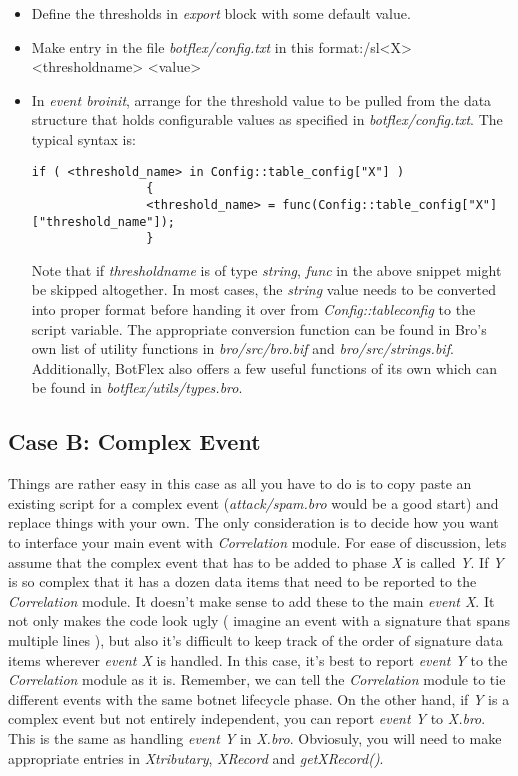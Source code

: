 \documentclass[acmtocl]{acmtrans2m}
\begin{document}
\begin{itemize}
\item Define the thresholds in \textit{export} block with some
default value.
\item Make entry in the file \textit{botflex/config.txt}
in this format:/sl{<X> <threshold\textunderscore name> <value>}
\item In \textit{event bro\textunderscore init}, arrange for the threshold value
to be pulled from the data structure that holds configurable
values as specified in \textit{botflex/config.txt}.
The typical syntax is:
\begin{verbatim}
if ( <threshold_name> in Config::table_config["X"] )
				{
				<threshold_name> = func(Config::table_config["X"]["threshold_name"]);
				}
\end{verbatim}

Note that if \textit{threshold\textunderscore name} is of type \textit{string}, 
\textit{func} in the above snippet might be skipped altogether. 
In most cases, the \textit{string} value needs to be converted into
proper format before handing it over from \textit{Config::table\textunderscore config}
to the script variable. The appropriate conversion function can be 
found in Bro's own list of utility functions in \textit{bro/src/bro.bif}
and \textit{bro/src/strings.bif}. Additionally, BotFlex also offers a few
useful functions of its own which can be found in 
\textit{botflex/utils/types.bro}.  				
\end{itemize}

\subsection{Case B: Complex Event}
Things are rather easy in this case as all you have to do
is to copy paste an existing script for a complex event
(\textit{attack/spam.bro} would be a good start)
and replace things with your own. The only consideration is
to decide how you want to interface your main event with
\textit{Correlation} module. For ease of discussion, lets assume 
that the complex event that has to be added to phase \textit{X} is called 
\textit{Y}. If \textit{Y} is so complex that it has a dozen data items 
that need to be reported to the \textit{Correlation} module.
It doesn't make sense to add these to the main \textit{event X}.
It not only makes the code look ugly ( imagine an event with a
signature that spans multiple lines ), but also it's difficult
to keep track of the order of signature data items wherever
\textit{event X} is handled. In this case, it's best to report 
\textit{event Y} to the \textit{Correlation} module as it is. 
Remember, we can tell the \textit{Correlation} module to tie different
events with the same botnet lifecycle phase. On the other hand,
if \textit{Y} is a complex event but not entirely independent, you
can report \textit{event Y} to \textit{X.bro}. This is the same as 
handling \textit{event Y} in \textit{X.bro}. Obviosuly, you will need to
make appropriate entries in \textit{X\textunderscore tributary}, \textit{XRecord} and 
\textit{getXRecord()}.
\end{document}
